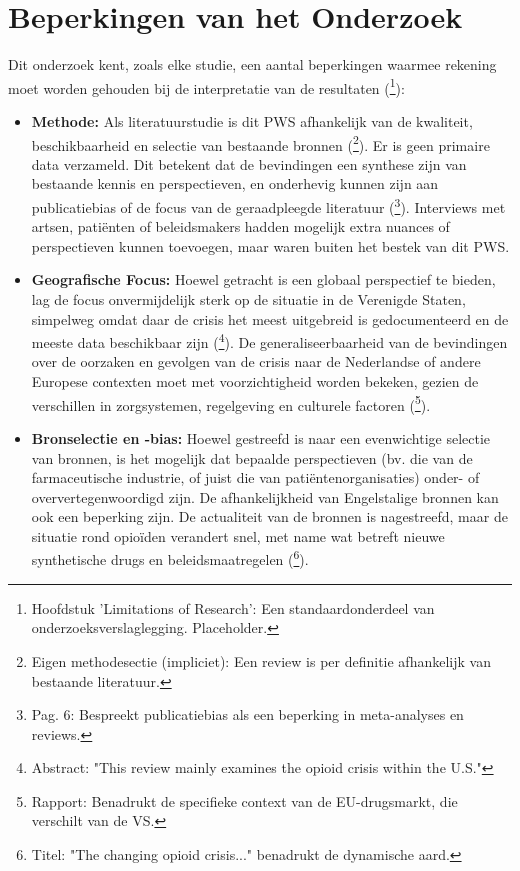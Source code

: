 \documentclass[11pt, a4paper]{report} %
\begin{document}
\section{Beperkingen van het Onderzoek}
Dit onderzoek kent, zoals elke studie, een aantal beperkingen waarmee rekening moet worden gehouden bij de interpretatie van de resultaten (\cite{SomeResearchMethodologyCritiqueChapter}\footnote{Hoofdstuk 'Limitations of Research': Een standaardonderdeel van onderzoeksverslaglegging. Placeholder.}):
\begin{itemize}
    \item \textbf{Methode:} Als literatuurstudie is dit PWS afhankelijk van de kwaliteit, beschikbaarheid en selectie van bestaande bronnen (\cite{Maclean2020EconomicStudiesOpioid}\footnote{Eigen methodesectie (impliciet): Een review is per definitie afhankelijk van bestaande literatuur.}). Er is geen primaire data verzameld. Dit betekent dat de bevindingen een synthese zijn van bestaande kennis en perspectieven, en onderhevig kunnen zijn aan publicatiebias of de focus van de geraadpleegde literatuur (\cite{Gurevitch2018MetaAnalysis}\footnote{Pag. 6: Bespreekt publicatiebias als een beperking in meta-analyses en reviews.}). Interviews met artsen, patiënten of beleidsmakers hadden mogelijk extra nuances of perspectieven kunnen toevoegen, maar waren buiten het bestek van dit PWS.
    \item \textbf{Geografische Focus:} Hoewel getracht is een globaal perspectief te bieden, lag de focus onvermijdelijk sterk op de situatie in de Verenigde Staten, simpelweg omdat daar de crisis het meest uitgebreid is gedocumenteerd en de meeste data beschikbaar zijn (\cite{Maclean2020EconomicStudiesOpioid}\footnote{Abstract: "This review mainly examines the opioid crisis within the U.S."}). De generaliseerbaarheid van de bevindingen over de oorzaken en gevolgen van de crisis naar de Nederlandse of andere Europese contexten moet met voorzichtigheid worden bekeken, gezien de verschillen in zorgsystemen, regelgeving en culturele factoren (\cite{EMCDDA2024HeroinGlobal}\footnote{Rapport: Benadrukt de specifieke context van de EU-drugsmarkt, die verschilt van de VS.}).
    \item \textbf{Bronselectie en -bias:} Hoewel gestreefd is naar een evenwichtige selectie van bronnen, is het mogelijk dat bepaalde perspectieven (bv. die van de farmaceutische industrie, of juist die van patiëntenorganisaties) onder- of oververtegenwoordigd zijn. De afhankelijkheid van Engelstalige bronnen kan ook een beperking zijn. De actualiteit van de bronnen is nagestreefd, maar de situatie rond opioïden verandert snel, met name wat betreft nieuwe synthetische drugs en beleidsmaatregelen (\cite{Volkow2021ChangingOpioidCrisis}\footnote{Titel: "The changing opioid crisis..." benadrukt de dynamische aard.}).

\end{itemize}
\end{document}
